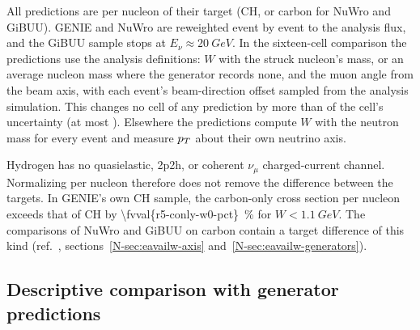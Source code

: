 All predictions are per nucleon of their target (CH, or carbon for NuWro and GiBUU). GENIE and NuWro are reweighted event by event to the analysis flux, and the GiBUU sample stops at $E_{\nu}\approx\SI{20}{GeV}$. In the sixteen-cell comparison the predictions use the analysis definitions: $W$ with the struck nucleon's mass, or an average nucleon mass where the generator records none, and the muon angle from the beam axis, with each event's beam-direction offset sampled from the analysis simulation. This changes no cell of any prediction by more than  of the cell's uncertainty (at most ). Elsewhere the predictions compute $W$ with the neutron mass for every event and measure $p_{T}$ about their own neutrino axis.

Hydrogen has no quasielastic, 2p2h, or coherent $\nu_{\mu}$ charged-current channel. Normalizing per nucleon therefore does not remove the difference between the targets. In GENIE's own CH sample, the carbon-only cross section per nucleon exceeds that of CH by \SI{\fvval{r5-conly-w0-pct}}{\percent} for $W<\SI{1.1}{GeV}$. The comparisons of NuWro and GiBUU on carbon contain a target difference of this kind (ref.~\cite{AnalysisNote2026}, sections~\ref*{N-sec:eavailw-axis} and~\ref*{N-sec:eavailw-generators}).


\subsection{Descriptive comparison with generator predictions}
\label{sec:gen16}

